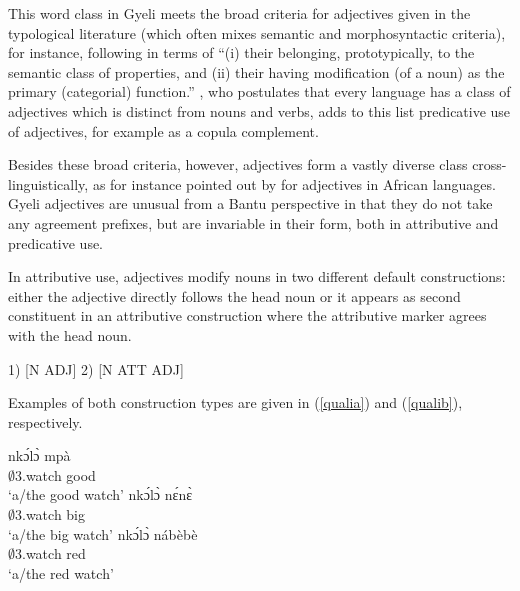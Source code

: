 This word class in Gyeli meets the broad criteria for adjectives given in the typological literature (which often mixes semantic and morphosyntactic criteria), for instance, following \citet[16]{bhat94} in terms of ``(i) their belonging, prototypically, to the semantic class of properties, and (ii) their having modification (of a noun) as the primary (categorial) function.'' 
\citet{dixon2004}, who postulates that every language has a class of adjectives which is distinct from nouns and verbs, adds to this list predicative use of adjectives, for example as a copula complement. 

Besides these broad criteria, however, adjectives form a vastly diverse class cross-linguistically, as for instance pointed out by \citet{segerer2008} for adjectives in African languages. Gyeli adjectives are unusual from a Bantu perspective in that they do not take any agreement prefixes, but are invariable in their form, both in attributive and predicative use.

In attributive use, adjectives modify nouns in two different default constructions: either the adjective directly follows the head noun or it appears as second constituent in an attributive construction where the attributive marker agrees with the head noun.
\begin{center}
1) [N ADJ]  2) [N ATT ADJ]
\end{center}

\noindent Examples of both construction types are given in (\ref{qualia}) and (\ref{qualib}), respectively.

\begin{exe}
\ex\label{qualia}
\begin{xlist}
\ex\label{qualia1}
 \gll  nkɔ́lɔ̀ mpà  \\
          $\emptyset$3.watch good  \\
    \trans `a/the good watch'
\ex \label{qualia2}
  \gll   nkɔ́lɔ̀ nɛ́nɛ̀ \\
          $\emptyset$3.watch big \\
    \trans `a/the big watch'
\ex \label{qualia3}
  \gll    nkɔ́lɔ̀ nábèbè \\
          $\emptyset$3.watch red \\
    \trans `a/the red watch'
\end {xlist}
\end {exe}

